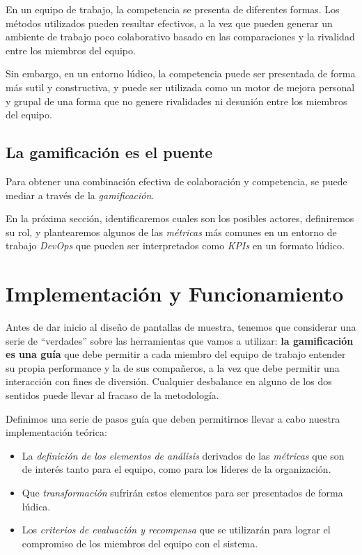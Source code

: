 \documentclass[journal]{IEEEtran}
\begin{document}
En un equipo de trabajo, la competencia se presenta de diferentes formas. Los métodos utilizados pueden resultar efectivos, a la vez que pueden generar un ambiente de trabajo poco colaborativo basado en las comparaciones y la rivalidad entre los miembros del equipo.

Sin embargo, en un entorno lúdico, la competencia puede ser presentada de forma más sutil y constructiva, y puede ser utilizada como un motor de mejora personal y grupal de una forma que no genere rivalidades ni desunión entre los miembros del equipo.

\subsection{\textbf{La gamificación es el puente}}
Para obtener una combinación efectiva de colaboración y competencia, se puede mediar a través de la \textit{gamificación}. 

En la próxima sección, identificaremos cuales son los posibles actores, definiremos su rol, y plantearemos algunos de las \textit{métricas} más comunes en un entorno de trabajo \textit{DevOps} que pueden ser interpretados como \textit{KPIs} en un formato lúdico.

\section{\textbf{\Large Implementación y Funcionamiento}}

Antes de dar inicio al diseño de pantallas de muestra, tenemos que considerar una serie de ``verdades'' sobre las herramientas que vamos a utilizar: \textbf{la gamificación es una guía} que debe permitir a cada miembro del equipo de trabajo entender su propia performance y la de sus compañeros, a la vez que debe permitir una interacción con fines de diversión. Cualquier desbalance en alguno de los dos sentidos puede llevar al fracaso de la metodología\cite[Quinta Parte: Gamificación - De los desafíos y misiones]{nallar2015estructuraludica}.

Definimos una serie de pasos guía que deben permitirnos llevar a cabo nuestra implementación teórica:

\begin{itemize}
    \item La \textit{definición de los elementos de análisis} derivados de las \textit{métricas} que son de interés tanto para el equipo, como para los líderes de la organización.
    \item Que \textit{transformación} sufrirán estos elementos para ser presentados de forma lúdica.
    \item Los \textit{criterios de evaluación y recompensa} que se utilizarán para lograr el compromiso de los miembros del equipo con el sistema.
\end{itemize}
\end{document}
